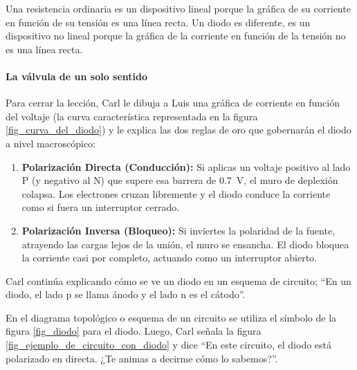 Una resistencia ordinaria es un dispositivo lineal porque la gráfica de su corriente en función de su tensión es una línea recta. Un diodo es diferente, es un dispositivo no lineal porque la gráfica de la corriente en función de la tensión no es una línea recta.

\paragraph{La válvula de un solo sentido}
Para cerrar la lección, Carl le dibuja a Luis una gráfica de corriente en función del voltaje (la curva característica representada en la figura \ref{fig_curva_del_diodo}) y le explica las dos reglas de oro que gobernarán el diodo a nivel macroscópico:
\begin{enumerate}
    \item \textbf{Polarización Directa (Conducción):} Si aplicas un voltaje positivo al lado P (y negativo al N) que supere esa barrera de \qty{0.7}{\volt}, el muro de deplexión colapsa. Los electrones cruzan libremente y el diodo conduce la corriente como si fuera un interruptor cerrado.
    \item \textbf{Polarización Inversa (Bloqueo):} Si inviertes la polaridad de la fuente, atrayendo las cargas lejos de la unión, el muro se ensancha. El diodo bloquea la corriente casi por completo, actuando como un interruptor abierto.
\end{enumerate}
Carl continúa explicando cómo se ve un diodo en un esquema de circuito; ``En un diodo, el lado p se llama ánodo y el lado n es el cátodo''. 

En el diagrama topológico o esquema de un circuito se utiliza el símbolo de la figura \ref{fig_diodo} para el diodo. Luego, Carl señala la figura \ref{fig_ejemplo_de_circuito_con_diodo} y dice ``En este circuito, el diodo está polarizado en directa. ¿Te animas a decirme cómo lo sabemos?''. 

